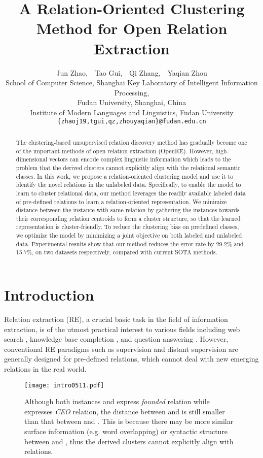 \documentclass[11pt]{article}
\title{A Relation-Oriented Clustering Method for Open Relation Extraction}
\author{Jun Zhao,\ \ Tao Gui\footnotemark[1],\ \ Qi Zhang\footnotemark[1],\ \  Yaqian Zhou\\
  School of Computer Science, Shanghai Key Laboratory of Intelligent Information Processing,\\
  Fudan University, Shanghai, China\\
  Institute of Modern Languages and Linguistics, Fudan University\\
  \texttt{\{zhaoj19,tgui,qz,zhouyaqian\}@fudan.edu.cn}}
\begin{document}
\maketitle

\renewcommand{\thefootnote}{\fnsymbol{footnote}}
\begin{abstract}

The clustering-based unsupervised relation discovery method has gradually become one of the important methods of open relation extraction (OpenRE). 
However, high-dimensional vectors can encode complex linguistic information which leads to the problem that the derived clusters cannot explicitly align with the relational semantic classes.
In this work, we propose a relation-oriented clustering model and use it to identify the novel relations in the unlabeled data. Specifically, to enable the model to learn to cluster relational data, our method leverages the readily available labeled data of pre-defined relations to learn a relation-oriented representation. 
We minimize distance between the instance with same relation by gathering the instances towards their corresponding relation centroids to form a cluster structure, so that the learned representation is cluster-friendly.
To reduce the clustering bias on predefined classes, we optimize the model by minimizing a joint objective on both labeled and unlabeled data. Experimental results show that our method reduces the error rate by 29.2\% and 15.7\%, on two datasets respectively, compared with current SOTA methods.
\end{abstract}

\section{Introduction}
Relation extraction (RE), a crucial basic task in the field of information extraction, is of the utmost practical interest to various fields including web search \citep{10.1145/3038912.3052558}, knowledge base completion \citep{10.5555/2999792.2999923}, and question answering \citep{yu-etal-2017-improved}. However, conventional RE paradigms such as supervision and distant supervision are generally designed for pre-defined relations, which cannot deal with new emerging relations in the real world.
    \begin{figure}[t]
        \texttt{[image: intro0511.pdf]}
        \caption{Although both instances  and  express \textit{founded} relation while  expresses \textit{CEO} relation, the distance between  and  is still smaller than that between  and . This is because there may be more similar surface information (e.g. word overlapping) or syntactic structure between  and , thus the derived clusters cannot explicitly align with relations.}
        \label{fig:intro}
    \end{figure}
    
\end{document}
